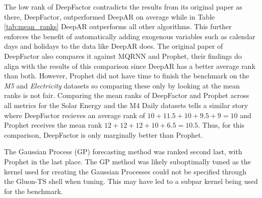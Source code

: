 The low rank of DeepFactor contradicts the results from its original paper as there, DeepFactor, outperformed DeepAR on average while in Table \ref{tab:mean_ranks} DeepAR outperforms all other algorithms. This further enforces the benefit of automatically adding exogenous variables such as calendar days and holidays to the data like DeepAR does. The original paper of DeepFactor also compares it against MQRNN and Prophet, their findings do align with the results of this comparison since DeepAR has a better average rank than both. However, Prophet did not have time to finish the benchmark on the \textit{M5} and \textit{Electricity} datasets so comparing these only by looking at the mean ranks is not fair. Comparing the mean ranks of DeepFactor and Prophet across all metrics for the Solar Energy and the M4 Daily datasets tells a similar story where DeepFactor recieves an average rank of \(10+11.5+10+9.5+9=10\) and Prophet receives the mean rank \(12+12+12+10+6.5=10.5\). Thus, for this comparison, DeepFactor is only marginally better than Prophet.

The Gaussian Process (GP) forecasting method was ranked second last, with Prophet in the last place. The GP method was likely suboptimally tuned as the kernel used for creating the Gaussian Processes could not be specified through the Gluon-TS shell when tuning. This may have led to a subpar kernel being used for the benchmark.

